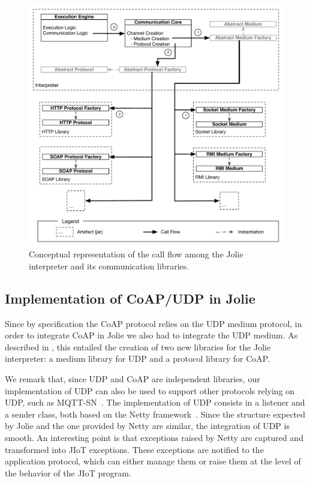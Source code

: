 \begin{figure}[t]
  \centering
  \includegraphics[width=\textwidth]{comm_modules.pdf}
  \caption{Conceptual representation of the call flow among the Jolie
  interpreter and its communication libraries.}
  \label{fig:comm_modules}
\end{figure}

\subsection{Implementation of CoAP/UDP in Jolie} %
\label{sec:impl_coap_udp}
%
Since by specification the CoAP protocol relies on the UDP medium protocol, in
order to integrate CoAP in Jolie we also had to integrate the UDP medium. As
described in , this entailed the creation of two
new libraries for the Jolie interpreter: a medium library for UDP and a
protocol library for CoAP.

We remark that, since UDP and CoAP are independent libraries, our 
implementation of UDP can also be used to support other protocols 
relying on UDP, such as MQTT-SN~\cite{hunkeler08}. 
The implementation of UDP consists in a listener and
a sender class, both based on the Netty framework~\cite{maurer16}. Since the
structure expected by Jolie and the one provided by Netty are similar, the
integration of UDP is smooth.
An interesting point is that exceptions raised by Netty are captured and
transformed into JIoT exceptions. These exceptions are notified to the
application protocol, which can either manage them or raise them at the level
of the behavior of the JIoT program.

